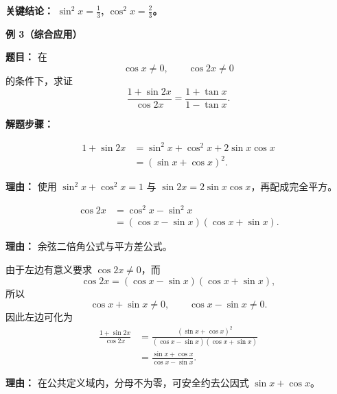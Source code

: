 \begin{examplebox}
	\textbf{\textcolor{CExample}{关键结论：}} \textbf{$\sin^2 x = \frac{1}{3}$, $\cos^2 x = \frac{2}{3}$。}

	\medskip
	\textbf{\textcolor{CExample}{例 3（综合应用）}}

	\textbf{\textcolor{CExample}{题目：}} 在
	\[
		\cos x\ne0,\qquad \cos 2x\ne0
	\]
	的条件下，求证
	\[
		\frac{1+\sin 2x}{\cos 2x} = \frac{1+\tan x}{1-\tan x}.
	\]

	\textbf{\textcolor{CExample}{解题步骤：}}
	\begin{description}[style=nextline, leftmargin=2.8em, labelsep=0.5em, itemsep=0.45em]
		\item[\textbf{第一步（分子配方）：}]
		      \[
			      \begin{aligned}
				      1+\sin 2x & = \sin^2 x + \cos^2 x + 2\sin x\cos x \\
				                & = (\sin x + \cos x)^2.
			      \end{aligned}
		      \]
		      \par\textbf{理由：} 使用 $\sin^2x+\cos^2x=1$ 与 $\sin2x=2\sin x\cos x$，再配成完全平方。

		\item[\textbf{第二步（分母平方差）：}]
		      \[
			      \begin{aligned}
				      \cos 2x & = \cos^2 x - \sin^2 x                 \\
				              & = (\cos x - \sin x)(\cos x + \sin x).
			      \end{aligned}
		      \]
		      \par\textbf{理由：} 余弦二倍角公式与平方差公式。

		\item[\textbf{第三步（约分化简）：}]
		      由于左边有意义要求 $\cos2x\ne0$，而
		      \[
			      \cos2x=(\cos x-\sin x)(\cos x+\sin x),
		      \]
		      所以
		      \[
			      \cos x+\sin x\ne0,\qquad \cos x-\sin x\ne0.
		      \]
		      因此左边可化为
		      \[
			      \begin{aligned}
				      \frac{1+\sin 2x}{\cos 2x}
				       & = \frac{(\sin x+\cos x)^2}{(\cos x-\sin x)(\cos x+\sin x)} \\
				       & = \frac{\sin x+\cos x}{\cos x-\sin x}.
			      \end{aligned}
		      \]
		      \par\textbf{理由：} 在公共定义域内，分母不为零，可安全约去公因式 $\sin x+\cos x$。


\end{description}
\end{examplebox}
